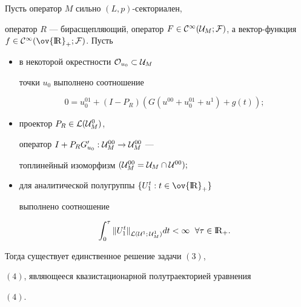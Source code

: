 \begin{thm}


Пусть оператор $M$ сильно $(L,p)$-секториален,


оператор $R$ --- бирасщепляющий, оператор $F \in {\cal C}^ \infty


({\cal U}_M;{\cal F})$, а вектор-функция $f \in {\cal C}^ \infty (\ov {\R}_+;


{\cal F})$. Пусть


\begin{itemize}


\item[(A1)] в некоторой окрестности ${\cal O}_{u_0} \subset {\cal U}_M$


точки $u_0$ выполнено соотношение


\begin{equation}


0=u^{01}_0+(I-P_R)(G(u^{00}+u_0^{01}+u^1)+g(t));


\end{equation}


\item[(A2)] проектор $P_R \in {\cal L} ({\cal U}_M^0)$,


оператор $I+P_RG'_{u_0}:{\cal U}_M^{00} \to {\cal U}_M^{00}$ ---


топлинейный изоморфизм $({\cal U}_M^{00}={\cal U}_M \cap {\cal U}^{00});$


\item[(A3)] для аналитической полугруппы $\{U^t_1:t \in \ov {\R}_+\}$


выполнено соотношение


\begin{equation}


\int_0^{\tau} {\| U_1^t \|}_{{\cal L}({\cal U}^1;\,{\cal U}_M^1)} dt< \infty


\ \;  \forall \tau \in {\R}_+.


\end{equation}


\end{itemize}





Тогда существует единственное решение задачи $(3)$,


$(4)$, являющееся квазистационарной полутраекторией уравнения


$(4)$.


\end{thm}





